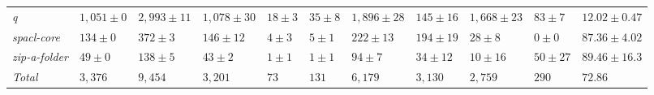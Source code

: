 \begin{table}
{\begin{tabular}[t]{lllllllllll}
\textit{q} & $1,051 \pm 0$ & $2,993 \pm 11$ & $1,078 \pm 30$ & $18 \pm 3$ & $35 \pm 8$ & $1,896 \pm 28$ & $145 \pm 16$ & $1,668 \pm 23$ & $83 \pm 7$ & $12.02 \pm 0.47$\\
\textit{spacl-core} & $134 \pm 0$ & $372 \pm 3$ & $146 \pm 12$ & $4 \pm 3$ & $5 \pm 1$ & $222 \pm 13$ & $194 \pm 19$ & $28 \pm 8$ & $0 \pm 0$ & $87.36 \pm 4.02$\\
\textit{zip-a-folder} & $49 \pm 0$ & $138 \pm 5$ & $43 \pm 2$ & $1 \pm 1$ & $1 \pm 1$ & $94 \pm 7$ & $34 \pm 12$ & $10 \pm 16$ & $50 \pm 27$ & $89.46 \pm 16.3$\\
\hline\textit{Total} & $3,376$ & $9,454$ & $3,201$ & $73$ & $131$ & $6,179$ & $3,130$ & $2,759$ & $290$ & $72.86$\\
\bottomrule
\end{tabular}}
\end{table}
